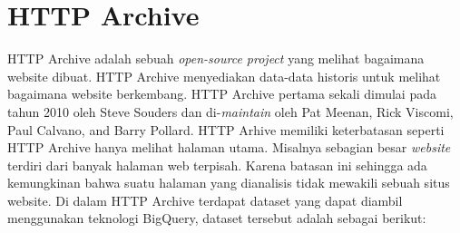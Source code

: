 \section{HTTP Archive \cite{httparchiveAbout}}
HTTP Archive adalah sebuah \textit{open-source project} yang melihat bagaimana website dibuat. HTTP Archive menyediakan data-data historis untuk melihat bagaimana website berkembang. HTTP Archive pertama sekali dimulai pada tahun 2010 oleh Steve Souders dan di-\textit{maintain} oleh Pat Meenan, Rick Viscomi, Paul Calvano, and Barry Pollard. HTTP Arhive memiliki keterbatasan seperti HTTP Archive hanya melihat halaman utama. Misalnya sebagian besar \textit{website} terdiri dari banyak halaman web terpisah. Karena batasan ini sehingga ada kemungkinan bahwa suatu halaman yang dianalisis tidak mewakili sebuah situs website. Di dalam HTTP Archive terdapat dataset yang dapat diambil menggunakan teknologi BigQuery, dataset tersebut adalah sebagai berikut:
